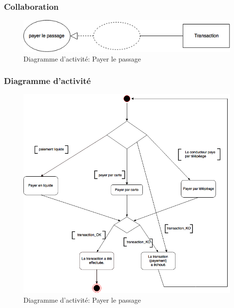 \subsubsection{Collaboration}
\begin{figure}[h]
    \centering
    \includegraphics[scale=0.6]{02_Desenvolvimento/TD2/images/ColaPayer.png}
    \caption{Diagramme d'activité: Payer le passage}
\end{figure}
\newpage
\subsubsection{Diagramme d'activité}
\begin{figure}[h]
    \centering
    \includegraphics[scale=0.6]{02_Desenvolvimento/TD2/images/DAPayePassage.png}
    \caption{Diagramme d'activité: Payer le passage}
\end{figure}
